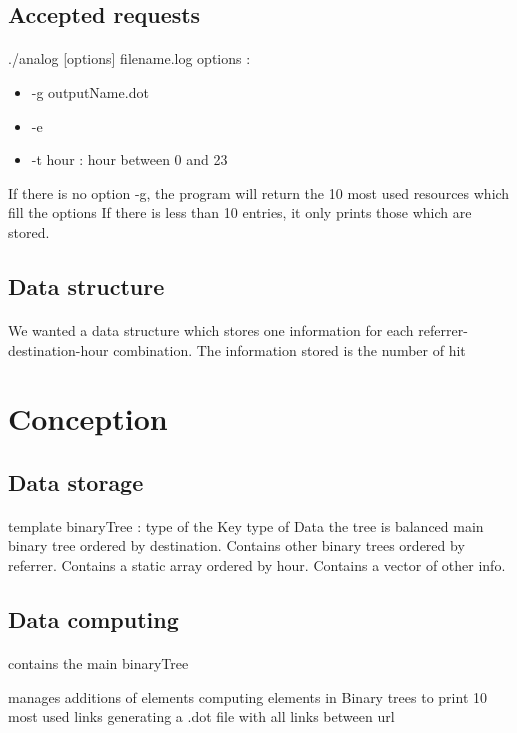 \documentclass[a4paper, 12pts]{article}
\begin{document}
\subsection{Accepted requests}
\paragraph{}
 ./analog [options] filename.log
 options :
 \begin{itemize}[label=$\square$]
 \item -g outputName.dot
 \item -e
 \item -t hour : hour between 0 and 23
 \end{itemize}
 If there is no option -g, the program will return the 10 most used resources which fill the options
 If there is less than 10 entries, it only prints those which are stored.

\subsection{Data structure}
\paragraph{}
 We wanted a data structure which stores one information for each referrer-destination-hour combination.
 The information stored is the number of hit
 
\newpage
 
\section{Conception}
\subsection{Data storage}
\paragraph{}
 template binaryTree :
    type of the Key
    type of Data
    the tree is balanced
main binary tree ordered by destination. Contains other binary trees ordered by referrer. Contains a static array ordered by hour. Contains a vector of other info.
\subsection{Data computing}
\paragraph{}
 contains the main binaryTree

 manages additions of elements
 computing elements in Binary trees to print 10 most used links
 generating a .dot file with all links between url
\end{document}
